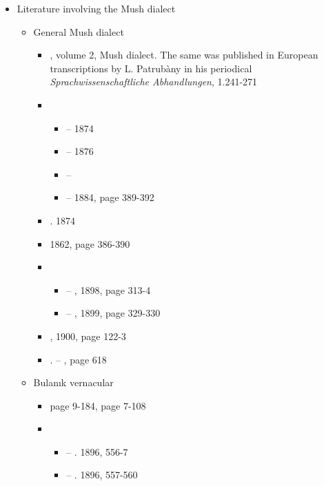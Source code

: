 \begin{itemize}
	\item Literature involving the Mush dialect
	\begin{itemize}
		\item General Mush dialect 
		\begin{itemize}
			\item \citet{Patkanian-1875-RussianDialects}, volume 2, Mush dialect. The same was published in European transcriptions by L. Patrubàny in his periodical \textit{Sprachwissenschaftliche Abhandlungen}, 1.241-271
			\item {} 
			\begin{itemize}
				\item –  1874
				\item –  1876
				
				\begin{adjarianpage}\label{page:121}\end{adjarianpage}%
				
				\item – 
				\item –  1884, page 389-392
			\end{itemize}
			\item {}. 1874
			\item {} 1862, page 386-390
			\item {} 
			\begin{itemize}
				\item – , 1898, page 313-4
				\item – , 1899, page 329-330
			\end{itemize}
			\item {}, 1900, page 122-3
			\item {}. – , page 618
			
		\end{itemize}
		\item Bulanık vernacular
		\begin{itemize}
			\item {}page 9-184,  page 7-108
			\item {} 
			\begin{itemize}
				\item – . 1896, 556-7
				\item – . 1896, 557-560
			\end{itemize}
			

\end{itemize}
\end{itemize}
\end{itemize}
